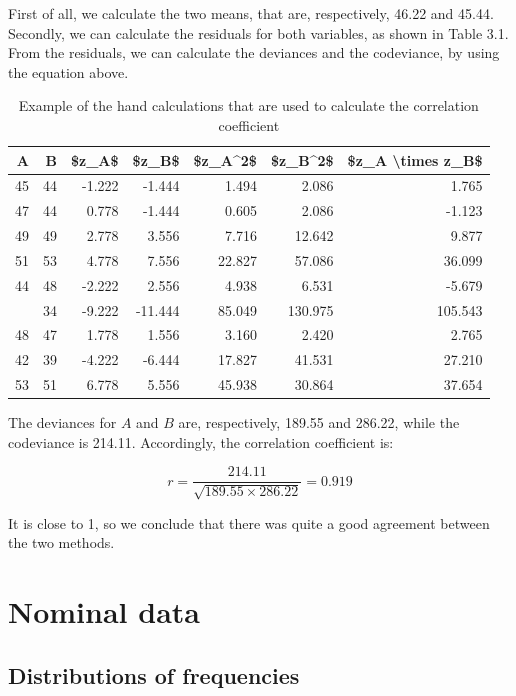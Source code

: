 \documentclass[a4paper,12pt,oneside]{book}
\begin{document}
First of all, we calculate the two means, that are, respectively, 46.22 and 45.44. Secondly, we can calculate the residuals for both variables, as shown in Table 3.1. From the residuals, we can calculate the deviances and the codeviance, by using the equation above.

\begin{table}

\caption{\label{tab:unnamed-chunk-3}Example of the hand calculations that are used to calculate the correlation coefficient}
\centering
\begin{tabular}[t]{rrrrrrr}
\toprule
A & B & \$z\_A\$ & \$z\_B\$ & \$z\_A\textasciicircum{}2\$ & \$z\_B\textasciicircum{}2\$ & \$z\_A \textbackslash{}times z\_B\$\\
\midrule
45 & 44 & -1.222 & -1.444 & 1.494 & 2.086 & 1.765\\
47 & 44 & 0.778 & -1.444 & 0.605 & 2.086 & -1.123\\
49 & 49 & 2.778 & 3.556 & 7.716 & 12.642 & 9.877\\
51 & 53 & 4.778 & 7.556 & 22.827 & 57.086 & 36.099\\
44 & 48 & -2.222 & 2.556 & 4.938 & 6.531 & -5.679\\
\addlinespace
37 & 34 & -9.222 & -11.444 & 85.049 & 130.975 & 105.543\\
48 & 47 & 1.778 & 1.556 & 3.160 & 2.420 & 2.765\\
42 & 39 & -4.222 & -6.444 & 17.827 & 41.531 & 27.210\\
53 & 51 & 6.778 & 5.556 & 45.938 & 30.864 & 37.654\\
\bottomrule
\end{tabular}
\end{table}

The deviances for \(A\) and \(B\) are, respectively, 189.55 and 286.22, while the codeviance is 214.11. Accordingly, the correlation coefficient is:

\[r = \frac{214.11}{\sqrt{189.55 \times 286.22}} = 0.919\]

It is close to 1, so we conclude that there was quite a good agreement between the two methods.

\hypertarget{nominal-data}{%
\section{Nominal data}\label{nominal-data}}

\hypertarget{distributions-of-frequencies}{%
\subsection{Distributions of frequencies}\label{distributions-of-frequencies}}
\end{document}

